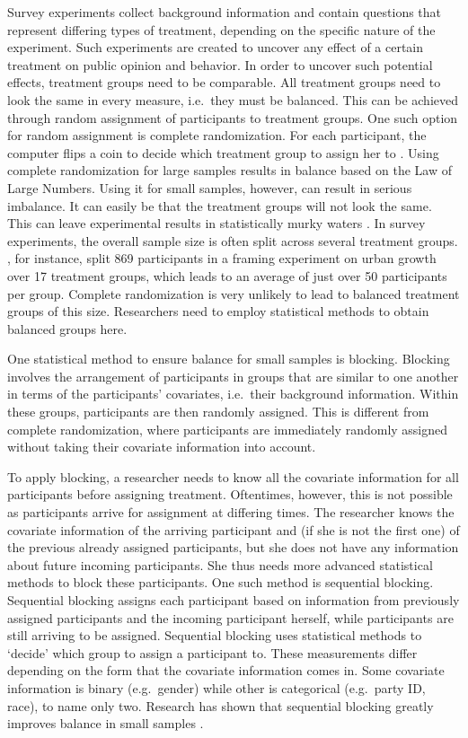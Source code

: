 \documentclass[12pt,]{article}
\begin{document}
Survey experiments collect background information and contain questions
that represent differing types of treatment, depending on the specific
nature of the experiment. Such experiments are created to uncover any
effect of a certain treatment on public opinion and behavior. In order
to uncover such potential effects, treatment groups need to be
comparable. All treatment groups need to look the same in every measure,
i.e.~they must be balanced. This can be achieved through random
assignment of participants to treatment groups. One such option for
random assignment is complete randomization. For each participant, the
computer flips a coin to decide which treatment group to assign her to
\citep{urdan_statistics_2010}. Using complete randomization for large
samples results in balance based on the Law of Large Numbers. Using it
for small samples, however, can result in serious imbalance. It can
easily be that the treatment groups will not look the same. This can
leave experimental results in statistically murky waters
\citep{imai_quantitative_2018, king_designing_1994, fox_applied_2015}.
In survey experiments, the overall sample size is often split across
several treatment groups. \citet{chong_framing_2007}, for instance,
split 869 participants in a framing experiment on urban growth over 17
treatment groups, which leads to an average of just over 50 participants
per group. Complete randomization is very unlikely to lead to balanced
treatment groups of this size. Researchers need to employ statistical
methods to obtain balanced groups here.

One statistical method to ensure balance for small samples is blocking.
Blocking involves the arrangement of participants in groups that are
similar to one another in terms of the participants' covariates,
i.e.~their background information. Within these groups, participants are
then randomly assigned. This is different from complete randomization,
where participants are immediately randomly assigned without taking
their covariate information into account.

To apply blocking, a researcher needs to know all the covariate
information for all participants before assigning treatment. Oftentimes,
however, this is not possible as participants arrive for assignment at
differing times. The researcher knows the covariate information of the
arriving participant and (if she is not the first one) of the previous
already assigned participants, but she does not have any information
about future incoming participants. She thus needs more advanced
statistical methods to block these participants. One such method is
sequential blocking. Sequential blocking assigns each participant based
on information from previously assigned participants and the incoming
participant herself, while participants are still arriving to be
assigned. Sequential blocking uses statistical methods to `decide' which
group to assign a participant to. These measurements differ depending on
the form that the covariate information comes in. Some covariate
information is binary (e.g.~gender) while other is categorical
(e.g.~party ID, race), to name only two. Research has shown that
sequential blocking greatly improves balance in small samples
\citep{moore_blocking_2013}.
\end{document}
